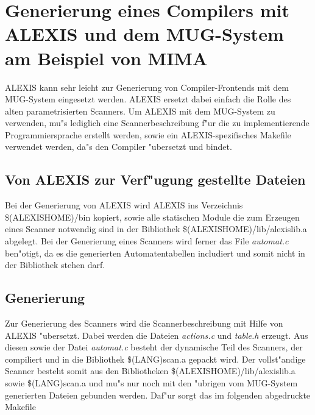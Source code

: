 \chapter{Generierung eines Compilers mit ALEXIS und dem MUG-System am Beispiel von
MIMA}
ALEXIS kann sehr leicht zur Generierung von Compiler-Frontends mit dem MUG-System
eingesetzt werden. ALEXIS ersetzt dabei einfach die Rolle des alten parametrisierten
Scanners. Um ALEXIS mit dem MUG-System zu verwenden, mu"s lediglich eine
Scannerbeschreibung f"ur die zu implementierende Programmiersprache erstellt werden,
sowie ein ALEXIS-spezifisches Makefile verwendet werden, da"s den Compiler
"ubersetzt und bindet.
\section{Von ALEXIS zur Verf"ugung gestellte Dateien}
Bei der Generierung von ALEXIS wird ALEXIS ins Verzeichnis \$(ALEXISHOME)/bin kopiert,
sowie alle statischen Module die zum Erzeugen eines Scanner notwendig sind in der
Bibliothek \$(ALEXISHOME)/lib/alexislib.a abgelegt. Bei der Generierung eines Scanners
wird ferner das File {\it automat.c\/} ben"otigt, da es die generierten
Automatentabellen includiert und somit nicht in der Bibliothek stehen darf.
\section{Generierung}
Zur Generierung des Scanners wird die Scannerbeschreibung mit Hilfe von ALEXIS
"ubersetzt. Dabei werden die Dateien {\it actions.c\/} und {\it table.h\/} erzeugt.
Aus diesen sowie der Datei {\it automat.c\/} besteht der dynamische Teil des Scanners,
der compiliert und in die Bibliothek \$(LANG)scan.a gepackt wird. Der vollst"andige
Scanner besteht somit aus den Bibliotheken \$(ALEXISHOME)/lib/alexislib.a sowie 
\$(LANG)scan.a und mu"s nur noch mit den "ubrigen vom MUG-System generierten Dateien
gebunden werden.
Daf"ur sorgt das im folgenden abgedruckte Makefile
